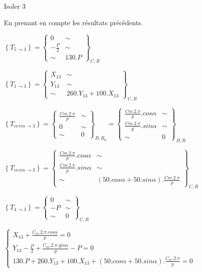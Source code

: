 Isoler 3

En prenant en compte les résultats précédents.

$\left\{T_{5\rightarrow 3}\right\}=\left\{
\begin{array}{cc}
0 & \sim \\
-\frac{P}{2} & \sim \\
\sim & 130.P
\end{array}
\right\}_{C,R}$

$\left\{T_{1\rightarrow 3}\right\}=\left\{
\begin{array}{cc}
X_{13} & \sim \\
Y_{13} & \sim \\
\sim & 260.Y_{13}+100.X_{13}
\end{array}
\right\}_{C,R}$

$\left\{T_{verin \rightarrow 3}\right\}=\left\{
\begin{array}{cc}
\frac{Cm.2.\pi}{p} & \sim \\
0 & \sim \\
\sim & 0
\end{array}
\right\}_{B,R_6}=\left\{
\begin{array}{cc}
\frac{Cm.2.\pi}{p}.cos\alpha & \sim \\
\frac{Cm.2.\pi}{p}.sin\alpha & \sim \\
\sim & 0
\end{array}
\right\}_{B,R}$

$\left\{T_{verin \rightarrow 3}\right\}=\left\{
\begin{array}{cc}
\frac{Cm.2.\pi}{p}.cos\alpha & \sim \\
\frac{Cm.2.\pi}{p}.sin\alpha & \sim \\
\sim & (50.cos\alpha+50.sin\alpha).\frac{Cm.2.\pi}{p}
\end{array}
\right\}_{C,R}$

$\left\{T_{4\rightarrow 3}\right\}=\left\{
\begin{array}{cc}
0 & \sim \\
-P & \sim \\
\sim & 0
\end{array}
\right\}_{C,R}$

$\left\{\begin{array}{l}
X_{13}+\frac{C_m.2.\pi.cos\alpha}{p}=0 \\
Y_{13}-\frac{P}{2}+\frac{C_m.2.\pi.qin\alpha}{p}-P=0 \\
130.P+260.Y_{13}+100.X_{13}+(50.cos\alpha+50.sin\alpha).\frac{C_m.2.\pi}{p}=0
\end{array}\right.$

